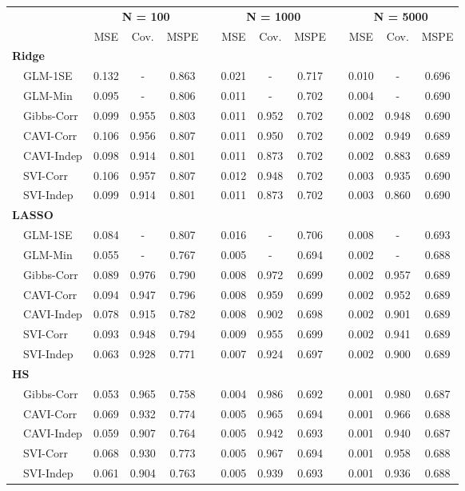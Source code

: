 \begin{center}
\begin{tabular}{lccccccccccc}
\hline\hline
\multicolumn{1}{l}{\bfseries }&\multicolumn{3}{c}{\bfseries N = 100}&\multicolumn{1}{c}{\bfseries }&\multicolumn{3}{c}{\bfseries N = 1000}&\multicolumn{1}{c}{\bfseries }&\multicolumn{3}{c}{\bfseries N = 5000}\tabularnewline
\cline{2-4} \cline{6-8} \cline{10-12}
\multicolumn{1}{l}{}&\multicolumn{1}{c}{MSE}&\multicolumn{1}{c}{Cov.}&\multicolumn{1}{c}{MSPE}&\multicolumn{1}{c}{}&\multicolumn{1}{c}{MSE}&\multicolumn{1}{c}{Cov.}&\multicolumn{1}{c}{MSPE}&\multicolumn{1}{c}{}&\multicolumn{1}{c}{MSE}&\multicolumn{1}{c}{Cov.}&\multicolumn{1}{c}{MSPE}\tabularnewline
\hline
{\bfseries Ridge}&&&&&&&&&&&\tabularnewline
~~GLM-1SE&0.132&-&0.863&&0.021&-&0.717&&0.010&-&0.696\tabularnewline
~~GLM-Min&0.095&-&0.806&&0.011&-&0.702&&0.004&-&0.690\tabularnewline
~~Gibbs-Corr&0.099&0.955&0.803&&0.011&0.952&0.702&&0.002&0.948&0.690\tabularnewline
~~CAVI-Corr&0.106&0.956&0.807&&0.011&0.950&0.702&&0.002&0.949&0.689\tabularnewline
~~CAVI-Indep&0.098&0.914&0.801&&0.011&0.873&0.702&&0.002&0.883&0.689\tabularnewline
~~SVI-Corr&0.106&0.957&0.807&&0.012&0.948&0.702&&0.003&0.935&0.690\tabularnewline
~~SVI-Indep&0.099&0.914&0.801&&0.011&0.873&0.702&&0.003&0.860&0.690\tabularnewline
\hline
{\bfseries LASSO}&&&&&&&&&&&\tabularnewline
~~GLM-1SE&0.084&-&0.807&&0.016&-&0.706&&0.008&-&0.693\tabularnewline
~~GLM-Min&0.055&-&0.767&&0.005&-&0.694&&0.002&-&0.688\tabularnewline
~~Gibbs-Corr&0.089&0.976&0.790&&0.008&0.972&0.699&&0.002&0.957&0.689\tabularnewline
~~CAVI-Corr&0.094&0.947&0.796&&0.008&0.959&0.699&&0.002&0.952&0.689\tabularnewline
~~CAVI-Indep&0.078&0.915&0.782&&0.008&0.902&0.698&&0.002&0.901&0.689\tabularnewline
~~SVI-Corr&0.093&0.948&0.794&&0.009&0.955&0.699&&0.002&0.941&0.689\tabularnewline
~~SVI-Indep&0.063&0.928&0.771&&0.007&0.924&0.697&&0.002&0.900&0.689\tabularnewline
\hline
{\bfseries HS}&&&&&&&&&&&\tabularnewline
~~Gibbs-Corr&0.053&0.965&0.758&&0.004&0.986&0.692&&0.001&0.980&0.687\tabularnewline
~~CAVI-Corr&0.069&0.932&0.774&&0.005&0.965&0.694&&0.001&0.966&0.688\tabularnewline
~~CAVI-Indep&0.059&0.907&0.764&&0.005&0.942&0.693&&0.001&0.940&0.687\tabularnewline
~~SVI-Corr&0.068&0.930&0.773&&0.005&0.967&0.694&&0.001&0.958&0.688\tabularnewline
~~SVI-Indep&0.061&0.904&0.763&&0.005&0.939&0.693&&0.001&0.936&0.688\tabularnewline
\hline
\end{tabular}\end{center}
